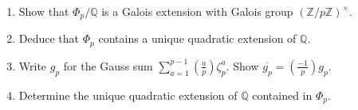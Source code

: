 \begin{exercise}
\label{algebra:2019:9}
\begin{enumerate}
    \item Show that $\Phi_p/\mathbb{Q}$ is a Galois extension with Galois group $(\mathbb{Z}/p\mathbb{Z})^\times$.
    \item Deduce that $\Phi_p$ contains a unique quadratic extension of $\mathbb{Q}$.
    \item Write $g_p$ for the Gauss sum $\sum_{a=1}^{p-1} \left(\frac{a}{p}\right) \zeta_p^a$. Show $\overline{g_p} = \left(\frac{-1}{p}\right) g_p$.
    \item Determine the unique quadratic extension of $\mathbb{Q}$ contained in $\Phi_p$.
\end{enumerate}
\end{exercise}

